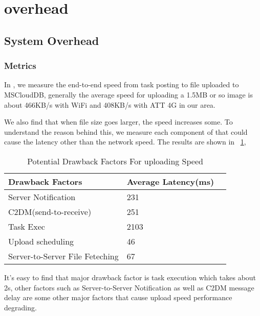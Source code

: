 \section{overhead}

\subsection{System Overhead}
\label{sec-4-3}

\subsubsection{Metrics}
 
In \mscope, we measure the end-to-end speed from task posting to file uploaded to MSCloudDB, generally the average speed for uploading a  1.5MB or so image is about 466KB/s with WiFi and 408KB/s with ATT 4G in our area. 

We also find that when file size goes larger, the speed increases some. To understand the reason behind this, we measure each component of \mscope that could cause the latency other than the network speed. The results are shown in ~\ref{tab:factor}, 
\begin{table}
    \centering
    \begin{tabular}{ | l | l | l |}
    \hline
    Drawback Factors & Average Latency(ms) \\ \hline
    Server Notification & 231 \\ \hline
    C2DM(send-to-receive) & 251 \\ \hline
    Task Exec & 2103 \\ \hline
    Upload scheduling & 46 \\ \hline
    Server-to-Server File Feteching  & 67 \\ \hline
    \end{tabular}
    \caption{Potential Drawback Factors For uploading Speed}
    \label{tab:factor}
\end{table}
It's  easy to find that major drawback factor is task execution which takes about 2s, other factors such as Server-to-Server Notification as well as C2DM message delay are some other major factors that cause \mscope upload speed performance degrading.


